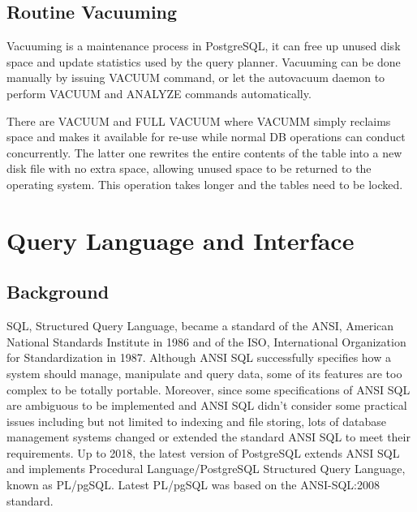 \documentclass[a4paper]{article}
\begin{document}
\subsection{Routine Vacuuming}

Vacuuming is a maintenance process in PostgreSQL, it can free up unused disk space and update statistics used by the query planner. Vacuuming can be done manually by issuing VACUUM command, or let the autovacuum daemon to perform VACUUM and ANALYZE commands automatically\cite{1}.

There are VACUUM and FULL VACUUM where VACUMM simply reclaims space and makes it available for re-use while normal DB operations can conduct concurrently. The latter one rewrites the entire contents of the table into a new disk file with no extra space, allowing unused space to be returned to the operating system. This operation takes longer and the tables need to be locked\cite{1}.

\section{Query Language and Interface}

\subsection{Background}

SQL, Structured Query Language, became a standard of the ANSI, American National Standards Institute in 1986 and of the ISO, International Organization for Standardization in 1987\cite{1}. Although ANSI SQL successfully specifies how a system should manage, manipulate and query data, some of its features are too complex to be totally portable. Moreover, since some specifications of ANSI SQL are ambiguous to be implemented and ANSI SQL didn't consider some practical issues including but not limited to indexing and file storing, lots of database management systems changed or extended the standard ANSI SQL to meet their requirements. Up to 2018, the latest version of PostgreSQL extends ANSI SQL and implements Procedural Language/PostgreSQL Structured Query Language, known as PL/pgSQL. Latest PL/pgSQL was based on the ANSI-SQL:2008 standard.
\end{document}
